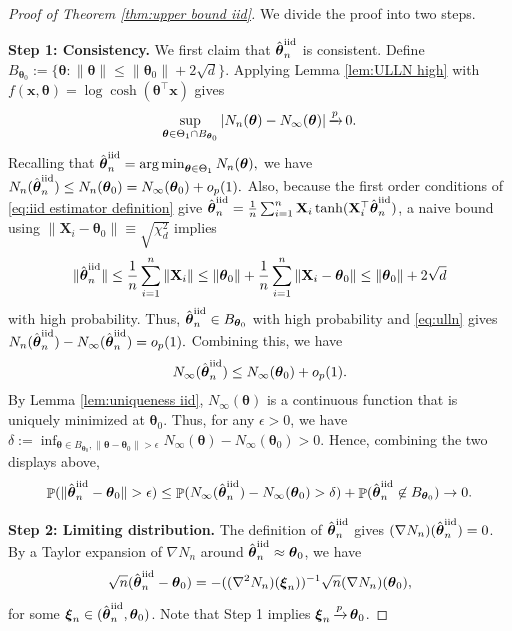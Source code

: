 \documentclass[preprint,reqno]{imsart}
\newcommand{\ttheta}{\boldsymbol{\theta}}
\DeclareMathOperator{\xp}{\xrightarrow{\mathnormal p}}
\DeclareMathOperator{\PP}{\mathbb{P}}
\newcommand{\x}{\mathbf{x}}
\newcommand{\X}{\mathbf{X}}
\DeclareMathOperator{\sumin}{\sum_{\mathnormal i=1}^{\mathnormal n}}
\newcommand{\thetaiid}{\hat{\boldsymbol \theta}^{\text{iid}}_{\mathnormal n}}
\DeclareMathOperator*{\argmin}{arg\,min}
\begin{document}
\begin{proof}[Proof of Theorem \ref{thm:upper bound iid}]
We divide the proof into two steps.

\textbf{Step 1: Consistency.}
We first claim that $\thetaiid$ is consistent. Define $B_{\ttheta_0} := \{\ttheta: \|\ttheta\| \le \|\ttheta_0\| + 2\sqrt{d} \}$.
Applying Lemma \ref{lem:ULLN high} with $f(\x, \ttheta) = \log \cosh (\ttheta^\top \x)$ gives
%
%
\begin{equation}\label{eq:ulln}
    \sup_{\ttheta\in \Theta_1 \cap B_{\ttheta_0}} |N_n(\ttheta) - N_{\infty}(\ttheta)| \xp 0.
\end{equation}
Recalling that $\thetaiid = \argmin_{\ttheta\in \Theta_1} N_n(\ttheta),$ we have $N_n(\thetaiid) \le N_n(\ttheta_0) = N_{\infty}(\ttheta_0) + o_p(1).$ Also, because the first order conditions of \eqref{eq:iid estimator definition} give $\thetaiid = \frac{1}{n} \sumin \X_i \tanh(\X_i^\top \thetaiid)$, a naive bound using $\|\X_i - \ttheta_0\| \equiv \sqrt{\chi^2_d}$ implies
\begin{align}\label{eq:estimator norm bound}
    \|\thetaiid\| \le \frac{1}{n}\sumin \|\X_i\| \le \|\ttheta_0\| + \frac{1}{n}\sumin \|\X_i - \ttheta_0\| \le \|\ttheta_0\| + 2\sqrt{d}
\end{align} with high probability. Thus, $\thetaiid \in B_{\ttheta_0}$ with high probability and \eqref{eq:ulln} gives
$N_n(\thetaiid) - N_{\infty}(\thetaiid) = o_p(1).$
Combining this, we have 
$$N_{\infty}(\thetaiid) \le N_{\infty}(\ttheta_0) + o_p(1).$$
By Lemma \ref{lem:uniqueness iid}, $N_{\infty}(\ttheta)$ is a continuous function that is uniquely minimized at $\ttheta_0$. Thus, for any $\epsilon > 0$, we have $\delta := \inf_{\ttheta \in B_{\ttheta_0}, \|\ttheta- \ttheta_0\| > \epsilon} N_{\infty}(\ttheta) - N_{\infty}(\ttheta_0) > 0$. Hence, combining the two displays above,
$$\PP(\|\thetaiid - \ttheta_0\| > \epsilon) \le \PP(N_{\infty}(\thetaiid) - N_{\infty}(\ttheta_0) > \delta) + \PP(\thetaiid \not \in B_{\ttheta_0}) \to 0.$$
%

\textbf{Step 2: Limiting distribution.}
%
The definition of $\thetaiid$ gives $(\nabla N_{n}) (\thetaiid) = 0$.
By a Taylor expansion of $\nabla N_n$ around $\thetaiid \approx \ttheta_0$, we have
\begin{equation}\label{eq:iid est eq}
    \sqrt{n} (\thetaiid - \ttheta_0) = - ((\nabla^2 N_n)(\boldsymbol{\xi}_n))^{-1}  {\sqrt{n} (\nabla N_n) (\ttheta_0)},
\end{equation}
for some $\boldsymbol{\xi}_n \in (\thetaiid, \ttheta_0)$. Note that Step 1 implies $\boldsymbol{\xi}_n \xp \ttheta_0$. 


\end{proof}
\end{document}
